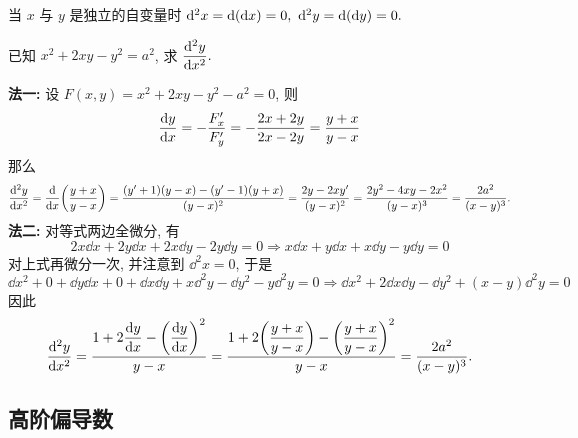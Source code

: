 \begin{theorem}
    当 $x$ 与 $y$ 是独立的自变量时 $\dd ^2x=\dd \qty(\dd x)=0,~\dd ^2y=\dd \qty(\dd y)=0.$
\end{theorem}

\begin{example}
    已知 $x^2+2xy-y^2=a^2$, 求 $\displaystyle\dv[2]{y}{x}.$
\end{example}
\begin{solution}
    \textbf{法一: }设 $F(x,y)=x^2+2xy-y^2-a^2=0$, 则 $$\dv{y}{x}=-\dfrac{F_x'}{F_y'}=-\dfrac{2x+2y}{2x-2y}=\dfrac{y+x}{y-x}$$
    那么 $$\dv[2]{y}{x}=\dv{x}\qty(\dfrac{y+x}{y-x})=\dfrac{\qty(y'+1)(y-x)-\qty(y'-1)(y+x)}{(y-x)^2}=\dfrac{2y-2xy'}{(y-x)^2}=\dfrac{2y^2-4xy-2x^2}{(y-x)^3}=\dfrac{2a^2}{(x-y)^3}.$$
    \textbf{法二: }对等式两边全微分, 有 $$2x\dd x+2y\dd x+2x\dd y-2y\dd y=0\Rightarrow x\dd x+y\dd x+x\dd y-y\dd y=0$$
    对上式再微分一次, 并注意到 $\dd ^2x=0$, 于是
    $$\dd x^2+0+\dd y\dd x+0+\dd x\dd y+x\dd ^2y-\dd y^2-y\dd ^2y=0\Rightarrow \dd x^2+2\dd x\dd y-\dd y^2+(x-y)\dd ^2y=0$$
    因此 $$\dv[2]{y}{x}=\dfrac{1+2\dfrac{\dd y}{\dd x}-\qty(\dfrac{\dd y}{\dd x})^2}{y-x}=\dfrac{1+2\qty(\dfrac{y+x}{y-x})-\qty(\dfrac{y+x}{y-x})^2}{y-x}=\dfrac{2a^2}{(x-y)^3}.$$
\end{solution}

\subsection{高阶偏导数}

